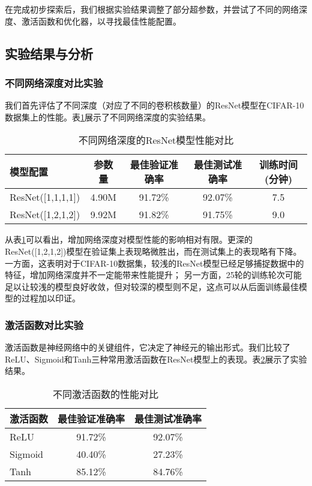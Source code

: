 \documentclass[12pt,a4paper]{article}
\begin{document}
在完成初步探索后，我们根据实验结果调整了部分超参数，并尝试了不同的网络深度、激活函数和优化器，以寻找最佳性能配置。

\subsection{实验结果与分析}

\subsubsection{不同网络深度对比实验}

我们首先评估了不同深度（对应了不同的卷积核数量）的ResNet模型在CIFAR-10数据集上的性能。表\ref{tab:basic_model}展示了不同网络深度的实验结果。

\begin{table}[htbp]
\centering
\caption{不同网络深度的ResNet模型性能对比}
\label{tab:basic_model}
\begin{tabular}{lcccc}
\toprule
\textbf{模型配置} & \textbf{参数量} & \textbf{最佳验证准确率} & \textbf{最佳测试准确率} & \textbf{训练时间(分钟)} \\
\midrule
ResNet([1,1,1,1]) & 4.90M & 91.72\% & 92.07\% & 7.5 \\
ResNet([1,2,1,2]) & 9.92M & 91.82\% & 91.75\% & 9.0 \\
\bottomrule
\end{tabular}
\end{table}

从表\ref{tab:basic_model}可以看出，增加网络深度对模型性能的影响相对有限。更深的ResNet([1,2,1,2])模型在验证集上表现略微胜出，而在测试集上的表现略有下降。
一方面，这表明对于CIFAR-10数据集，较浅的ResNet模型已经足够捕捉数据中的特征，增加网络深度并不一定能带来性能提升；
另一方面，25轮的训练轮次可能足以让较浅的模型良好收敛，但对较深的模型则不足，这点可以从后面训练最佳模型的过程加以印证。

\subsubsection{激活函数对比实验}

激活函数是神经网络中的关键组件，它决定了神经元的输出形式。我们比较了ReLU、Sigmoid和Tanh三种常用激活函数在ResNet模型上的表现。表\ref{tab:activation_functions}展示了实验结果。

\begin{table}[htbp]
\centering
\caption{不同激活函数的性能对比}
\label{tab:activation_functions}
\begin{tabular}{lcc}
\toprule
\textbf{激活函数} & \textbf{最佳验证准确率} & \textbf{最佳测试准确率} \\
\midrule
ReLU & 91.72\% & 92.07\% \\
Sigmoid & 40.40\% & 27.23\% \\
Tanh & 85.12\% & 84.76\% \\
\bottomrule
\end{tabular}
\end{table}
\end{document}
